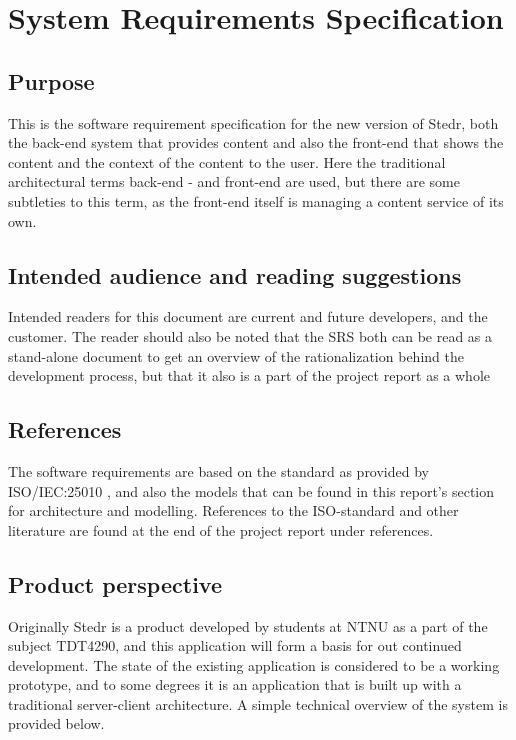 \section{System Requirements Specification}
\thispagestyle{plain}

\subsection{Purpose}
This is the software requirement specification for the new version of Stedr, both the back-end system that provides content and also the front-end that shows the content and the context of the content to the user. Here the traditional architectural terms back-end - and front-end are used, but there are some subtleties to this term, as the front-end itself is managing a content service of its own. 

\subsection{Intended audience and reading suggestions}
Intended readers for this document are current and future developers, and the customer. The reader should also be noted that the SRS both can be read as a stand-alone document to get an overview of the rationalization behind the development process, but that it also is a part of the project report as a whole


\subsection{References}
The software requirements are based on the standard as provided by ISO/IEC:25010 \cite[10]{25010}, and also the models that can be found in this report's section for architecture and modelling. References to the ISO-standard and other literature are found at the end of the project report under references.

\subsection{Product perspective}
Originally Stedr is a product developed by students at NTNU as a part of the subject TDT4290, and this application will form a basis for out continued development. The state of the existing application is considered to be a working prototype, and to some degrees it is an application that is built up with a traditional server-client architecture. A simple technical overview of the system is provided below. 

